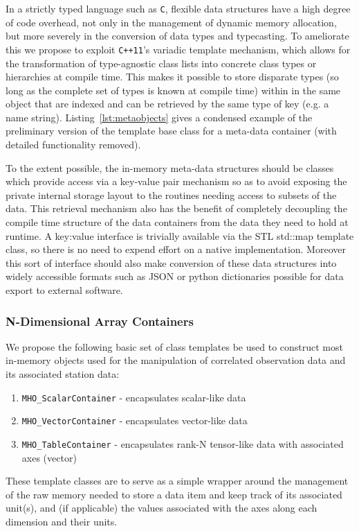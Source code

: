 In a strictly typed language such as \texttt{C}, flexible data structures have a high degree of code overhead, not only in the management of dynamic memory allocation, but more severely in the conversion of data types and typecasting. To ameliorate this we propose to exploit \texttt{C++11}'s variadic template mechanism, which allows for the transformation of type-agnostic class lists into concrete class types or hierarchies at compile time. This makes it possible to store disparate types (so long as the complete set of types is known at compile time) within in the same object that are indexed and can be retrieved by the same type of key (e.g. a name string). Listing~\ref{lst:metaobjects} gives a condensed example of the preliminary version of the template base class for a meta-data container (with detailed functionality removed).



To the extent possible, the in-memory meta-data structures should be classes which provide access via a key-value pair mechanism so as to avoid exposing the private internal storage layout to the routines needing access to subsets of the data. This retrieval mechanism also has the benefit of completely decoupling the compile
time structure of the data containers from the data they need to hold at runtime. A key:value interface is trivially available via the STL std::map template class,
so there is no need to expend effort on a native implementation. Moreover this sort of interface should also make conversion of these data structures into widely accessible formats such as JSON or python dictionaries possible for data export to external software.

\subsubsection{N-Dimensional Array Containers}

We propose the following basic set of class templates be used to construct most in-memory objects used for the manipulation of correlated observation data and its associated station data:
\begin{enumerate}
 \item \texttt{MHO\_ScalarContainer} - encapsulates scalar-like data
 \item \texttt{MHO\_VectorContainer} - encapsulates vector-like data
 \item \texttt{MHO\_TableContainer} - encapsulates rank-N tensor-like data with associated axes (vector)
\end{enumerate}
These template classes are to serve as a simple wrapper around the management of the raw memory needed to store a data item and keep track of its associated unit(s), and (if applicable) the values associated with the axes along each dimension and their units.

